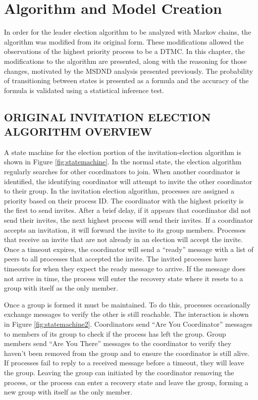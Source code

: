 \chapter{Algorithm and Model Creation}

In order for the leader election algorithm to be analyzed with Markov chains, the algorithm was modified from its original form.
These modifications allowed the observations of the highest priority process to be a \ac{DTMC}.
In this chapter, the modifications to the algorithm are presented, along with the reasoning for those changes, motivated by the MSDND analysis presented previously.
The probability of transitioning between states is presented as a formula and the accuracy of the formula is validated using a statistical inference test.

\section{ORIGINAL INVITATION ELECTION ALGORITHM OVERVIEW}

A state machine for the election portion of the invitation-election algorithm is shown in Figure \ref{fig:statemachine}.
In the normal state, the election algorithm regularly searches for other coordinators to join.
When another coordinator is identified, the identifying coordinator will attempt to invite the other coordinator to their group.
In the invitation election algorithm, processes are assigned a priority based on their process ID.
The coordinator with the highest priority is the first to send invites.
After a brief delay, if it appears that coordinator did not send their invites, the next highest process will send their invites.
If a coordinator accepts an invitation, it will forward the invite to its group members.
Processes that receive an invite that are not already in an election will accept the invite.
Once a timeout expires, the coordinator will send a ``ready'' message with a list of peers to all processes that accepted the invite.
The invited processes have timeouts for when they expect the ready message to arrive.
If the message does not arrive in time, the process will enter the recovery state where it resets to a group with itself as the only member.

Once a group is formed it must be maintained.
To do this, processes occasionally exchange messages to verify the other is still reachable.
The interaction is shown in Figure \ref{fig:statemachine2}.
Coordinators send ``Are You Coordinator'' messages to members of its group to check if the process has left the group.
Group members send ``Are You There'' messages to the coordinator to verify they haven't been removed from the group and to ensure the coordinator is still alive.
If processes fail to reply to a received message before a timeout, they will leave the group.
Leaving the group can initiated by the coordinator removing the process, or the process can enter a recovery state and leave the group, forming a new group with itself as the only member.


